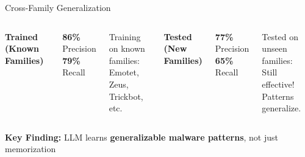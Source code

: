 \documentclass[11pt,aspectratio=16:9]{beamer}
\begin{document}
\begin{frame}{Cross-Family Generalization}
  \vspace{0.5cm}
  \begin{columns}
    \centering
    \textbf{\textcolor{accent1}{Trained (Known Families)}}\\[0.5cm]
    \begin{tcolorbox}[colback=accent1!20, colframe=accent1, boxrule=3pt, arc=8pt]
      \Large
      \textbf{\textcolor{accent1}{86\%}} Precision\\
      \textbf{\textcolor{accent1}{79\%}} Recall
    \end{tcolorbox}
    
    \vspace{0.5cm}
    {\small Training on known families:\\
    Emotet, Zeus, Trickbot, etc.}
    
    \centering
    \textbf{\textcolor{accent2}{Tested (New Families)}}\\[0.5cm]
    \begin{tcolorbox}[colback=accent2!20, colframe=accent2, boxrule=3pt, arc=8pt]
      \Large
      \textbf{\textcolor{accent2}{77\%}} Precision\\
      \textbf{\textcolor{accent2}{65\%}} Recall
    \end{tcolorbox}
    
    \vspace{0.5cm}
    {\small Tested on unseen families:\\
    Still effective! Patterns generalize.}
  \end{columns}
  
  \vspace{1cm}
  \begin{tcolorbox}[colback=accent3!10, colframe=accent3, boxrule=2pt]
    \centering \large
    \textbf{Key Finding:} LLM learns \textbf{generalizable malware patterns}, not just memorization
  \end{tcolorbox}
\end{frame}
\end{document}
